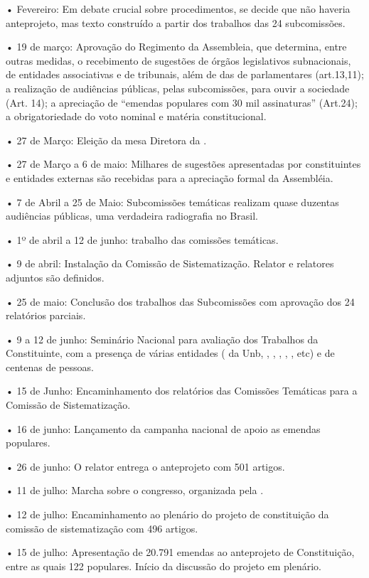 • Fevereiro: Em debate crucial sobre procedimentos, se decide que não
haveria anteprojeto, mas texto construído a partir dos trabalhos das 24
subcomissões.

• 19 de março: Aprovação do Regimento da Assembleia, que determina,
entre outras medidas, o recebimento de sugestões de órgãos legislativos
subnacionais, de entidades associativas e de tribunais, além de das de
parlamentares (art.13,11); a realização de audiências públicas, pelas
subcomissões, para ouvir a sociedade (Art. 14); a apreciação de
``emendas populares com 30 mil assinaturas'' (Art.24); a obrigatoriedade
do voto nominal e matéria constitucional.

• 27 de Março: Eleição da mesa Diretora da .

• 27 de Março a 6 de maio: Milhares de sugestões apresentadas por
constituintes e entidades externas são recebidas para a apreciação
formal da Assembléia.

• 7 de Abril a 25 de Maio: Subcomissões temáticas realizam quase
duzentas audiências públicas, uma verdadeira radiografia no Brasil.

• 1º de abril a 12 de junho: trabalho das comissões temáticas.

• 9 de abril: Instalação da Comissão de Sistematização. Relator e
relatores adjuntos são definidos.

• 25 de maio: Conclusão dos trabalhos das Subcomissões com aprovação dos
24 relatórios parciais.

• 9 a 12 de junho: Seminário Nacional para avaliação dos Trabalhos da
Constituinte, com a presença de várias entidades ( da Unb, ,
, , , , etc) e de centenas de pessoas.

• 15 de Junho: Encaminhamento dos relatórios das Comissões Temáticas
para a Comissão de Sistematização.

• 16 de junho: Lançamento da campanha nacional de apoio as emendas
populares.

• 26 de junho: O relator entrega o anteprojeto com 501 artigos.

• 11 de julho: Marcha sobre o congresso, organizada pela .

• 12 de julho: Encaminhamento ao plenário do projeto de constituição da
comissão de sistematização com 496 artigos.

• 15 de julho: Apresentação de 20.791 emendas ao anteprojeto de
Constituição, entre as quais 122 populares. Início da discussão do
projeto em plenário.

